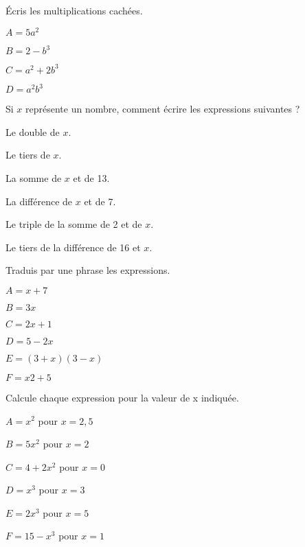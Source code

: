 \begin{exercice}
Écris les multiplications cachées.
\begin{colenumerate}{2}
\item $A = 5a^2$
\item $B = 2 - b^3$
\item $C = a^2 + 2b^3$
\item $D = a^2b^3$
\end{colenumerate}
\end{exercice}

\begin{exercice}[]
Si $x$ représente un nombre, comment écrire les expressions suivantes ?

\begin{colenumerate}{1} 
\item Le double de $x$.
\item Le tiers de $x$.
\item La somme de $x$ et de 13. 
\item La différence de $x$ et de 7. 
\item Le triple de la somme de 2 et de $x$.
\item Le tiers de la différence de 16 et $x$.
\end{colenumerate} 
\end{exercice}

\begin{exercice}[] Traduis par une phrase les expressions.
\begin{colenumerate}{2}
\item $A = x + 7$
\item $B = 3x$
\item $C = 2x + 1$
\item $D = 5 - 2x$
\item $E = (3 + x)(3 - x)$
\item $F = x2 + 5$
\end{colenumerate}
\end{exercice}

\begin{exercice}[] Calcule chaque expression pour la valeur de x indiquée.
\begin{colenumerate}{2}
\item $A = x^2$	pour $x = 2,5$
\item $B = 5x^2$	pour $x = 2$
\item $C = 4 + 2x^2$	pour $x = 0$
\item $D = x^3$	pour $x = 3$
\item $E = 2x^3$	pour $x = 5$
\item $F = 15 - x^3$	pour $x = 1$
\end{colenumerate}
\end{exercice}

